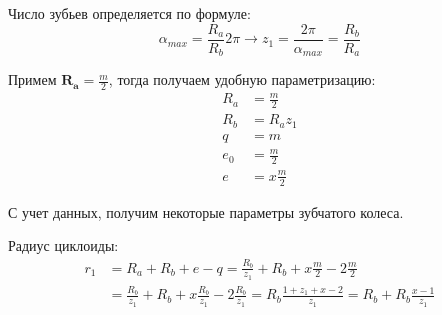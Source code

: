 \documentclass[a4paper, 12pt]{article}
\begin{document}
Число зубьев определяется по формуле:
\begin{equation}
    \alpha_{max} = \frac{R_a}{R_b}2\pi \rightarrow z_1 = \frac{2\pi}{\alpha_{max}} = \frac{R_b}{R_a}
\end{equation}
    
Примем $\bm{R_a} = \frac{m}{2}$, тогда получаем удобную параметризацию:
\begin{align}
    R_a & = \frac{m}{2} \\
    R_b & = R_a z_1 \\
    q   & = m \\
    e_0 & = \frac{m}{2} \\
    e   & = x \frac{m}{2}
\end{align}

С учет данных, получим некоторые параметры зубчатого колеса.

Радиус циклоиды:
\begin{equation}
    \begin{split}
        r_1 & = R_a + R_b + e - q = \frac{R_b}{z_1} + R_b + x\frac{m}{2} - 2\frac{m}{2} \\
            & = \frac{R_b}{z_1} + R_b + x\frac{R_b}{z_1} - 2 \frac{R_b}{z_1} = R_b \frac{1+z_1+x-2}{z_1} = R_b + R_b\frac{x-1}{z_1}
    \end{split}
\end{equation}
\end{document}
